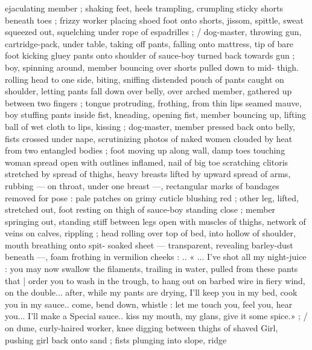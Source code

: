 ejaculating member ; shaking feet, heels trampling, crumpling sticky
shorts beneath toes ; frizzy worker placing shoed foot onto shorts,
jissom, spittle, sweat squeezed out, squelching under rope of
espadrilles ; / dog-master, throwing gun, cartridge-pack, under table,
taking off pants, falling onto mattress, tip of bare foot kicking gluey
pants onto shoulder of sauce-boy turned back towards gun ; boy,
spinning around, member bouncing over shorts pulled down to mid-
thigh. rolling head to one side, biting, sniffing distended pouch of
pants caught on shoulder, letting pants fall down over belly, over
arched member, gathered up between two fingers ; tongue
protruding, frothing, from thin lips seamed mauve, boy stuffing pants
inside fist, kneading, opening fist, member bouncing up, lifting ball
of wet cloth to lips, kissing ; dog-master, member pressed back onto
belly, fists crossed under nape, scrutinizing photos of naked women
clouded by heat from two entangled bodies ; foot moving up along
wall, damp toes touching woman spread open with outlines inflamed,
nail of big toe scratching clitoris stretched by spread of thighs,
heavy breasts lifted by upward spread of arms, rubbing — on throat,
under one breast —, rectangular marks of bandages removed for
pose : pale patches on grimy cuticle blushing red ; other leg, lifted,
stretched out, foot resting on thigh of sauce-boy standing close ;
member springing out, standing stiff between legs open with
muscles of thighs, network of veins on calves, rippling ; head rolling
over top of bed, into hollow of shoulder, mouth breathing onto spit-
soaked sheet — transparent, revealing barley-dust beneath —,
foam frothing in vermilion cheeks : .. « ... I've shot all my night-juice
: you may now swallow the filaments, trailing in water, pulled from
these pants that | order you to wash in the trough, to hang out on
barbed wire in fiery wind, on the double... after, while my pants are
drying, I'll keep you in my bed, cook you in my sauce.. come, bend
down, whistle : let me touch you, feel you, hear you... I'll make a
Special sauce.. kiss my mouth, my glans, give it some spice.» ; / on
dune, curly-haired worker, knee digging between thighs of shaved
Girl, pushing girl back onto sand ; fists plunging into slope, ridge

